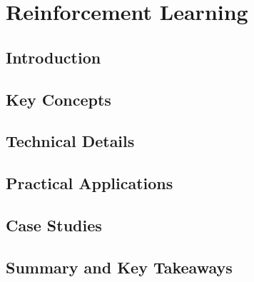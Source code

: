 ﻿%

\chapter{Reinforcement Learning}
\label{ch:chapter-06}

\section{Introduction}


\section{Key Concepts}


\section{Technical Details}


\section{Practical Applications}


\section{Case Studies}


\section{Summary and Key Takeaways}


